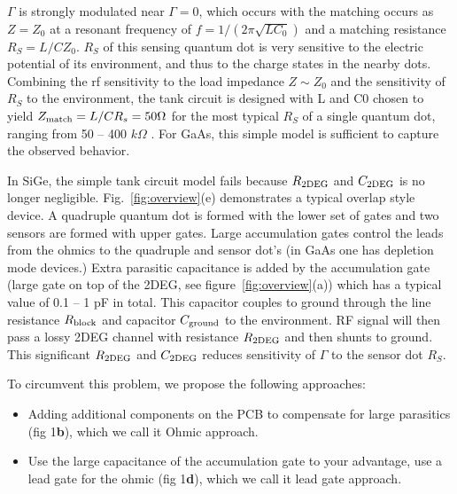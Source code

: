 \documentclass[]{article}
\begin{document}
$\Gamma$ is strongly modulated near $\Gamma = 0$, which occurs with the matching occurs as $Z=Z_0$ at a resonant frequency of $f=1/(2\pi \sqrt{LC_0})$ and a matching resistance $R_S=L/CZ_0$. $R_S$ of this sensing quantum dot is very sensitive to the electric potential of its environment, and thus to the charge states in the nearby dots. Combining the rf sensitivity to the load impedance $Z\sim Z_0$ and the sensitivity of $R_S$ to the environment, the tank circuit is designed with L and C0 chosen to yield $Z_{\rm match} = L/CR_s= 50 \Omega$  for the most typical $R_S$ of a single quantum dot, ranging from 50 -- 400 $k\Omega$
.   For GaAs, this simple model is sufficient to capture the observed behavior. 

In SiGe, the simple tank circuit model fails because $R_{\rm 2DEG}$ and $C_{\rm 2DEG}$ is no longer negligible.	Fig.\ \ref{fig:overview}(e) demonstrates a typical overlap style device.  A quadruple quantum dot is formed with the lower set of gates and two sensors are formed with upper gates. Large accumulation gates control the leads from the ohmics to the quadruple and sensor dot’s (in GaAs one has depletion mode devices.)
Extra parasitic capacitance is added by the accumulation gate (large gate on top of the 2DEG, see figure\ \ref{fig:overview}(a)) which has a typical value of \color{red} 0.1 -- 1 pF \color{black} in total. This capacitor couples to ground through the line resistance $R_{\rm block}$ and capacitor $C_{\rm ground}$ to the environment. RF signal will then pass a lossy 2DEG channel with resistance $R_{\rm 2DEG}$ and then shunts to ground. This significant $R_{\rm 2DEG}$ and $C_{\rm 2DEG}$ reduces sensitivity of $\Gamma$ to the sensor dot $R_S$. %


To circumvent this problem, we propose the following approaches:
\begin{itemize}
	\item Adding additional components on the PCB to compensate for large parasitics (fig 1\textbf{b}), which we call it Ohmic approach.
	\item Use the large capacitance of the accumulation gate to your advantage, use a lead gate for the ohmic (fig 1\textbf{d}), which we call it lead gate approach.
\end{itemize}
\end{document}
